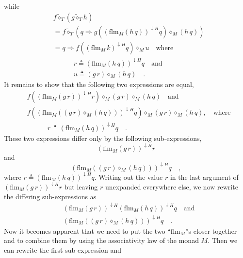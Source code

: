 while 
\begin{align*}
 & f\tilde{\diamond}_{T}\left(g\tilde{\diamond}_{T}h\right)\\
 & =f\tilde{\diamond}_{T}\left(q\Rightarrow g\left(\left(\text{flm}_{M}\left(h\,q\right)\right)^{\downarrow H}q\right)\diamond_{M}\left(h\,q\right)\right)\\
 & =q\Rightarrow f\left(\left(\text{flm}_{M}\,k\right)^{\downarrow H}q\right)\diamond_{M}u\quad\text{where}\\
 & \quad\quad\quad r\triangleq\left(\text{flm}_{M}\left(h\,q\right)\right)^{\downarrow H}q\quad\text{and}\\
 & \quad\quad\quad u\triangleq\left(g\,r\right)\diamond_{M}\left(h\,q\right)\quad.
\end{align*}
It remains to show that the following two expressions are equal,
\begin{align*}
 & f\left(\left(\text{flm}_{M}\left(g\,r\right)\right)^{\downarrow H}r\right)\diamond_{M}\left(g\,r\right)\diamond_{M}\left(h\,q\right)\quad\text{and}\\
 & f\left(\left(\text{flm}_{M}\left(\left(g\,r\right)\diamond_{M}\left(h\,q\right)\right)\right)^{\downarrow H}q\right)\diamond_{M}\left(g\,r\right)\diamond_{M}\left(h\,q\right),\quad\text{where}\\
 & \quad\quad\quad r\triangleq\left(\text{flm}_{M}\left(h\,q\right)\right)^{\downarrow H}q\quad.
\end{align*}
These two expressions differ only by the following sub-expressions,
\[
\left(\text{flm}_{M}\left(g\,r\right)\right)^{\downarrow H}r
\]
and 
\[
\left(\text{flm}_{M}\left(\left(g\,r\right)\diamond_{M}\left(h\,q\right)\right)\right)^{\downarrow H}q\quad,
\]
where $r\triangleq\left(\text{flm}_{M}\left(h\,q\right)\right)^{\downarrow H}q$.
Writing out the value $r$ in the last argument of $\left(\text{flm}_{M}\left(g\,r\right)\right)^{\downarrow H}r$
but leaving $r$ unexpanded everywhere else, we now rewrite the differing
sub-expressions as
\begin{align*}
 & \left(\text{flm}_{M}\left(g\,r\right)\right)^{\downarrow H}\left(\text{flm}_{M}\left(h\,q\right)\right)^{\downarrow H}q\quad\text{and}\\
 & \left(\text{flm}_{M}\left(\left(g\,r\right)\diamond_{M}\left(h\,q\right)\right)\right)^{\downarrow H}q\quad.
\end{align*}
Now it becomes apparent that we need to put the two ``$\text{flm}_{M}$''s
closer together and to combine them by using the associativity law
of the monad $M$. Then we can rewrite the first sub-expression and
